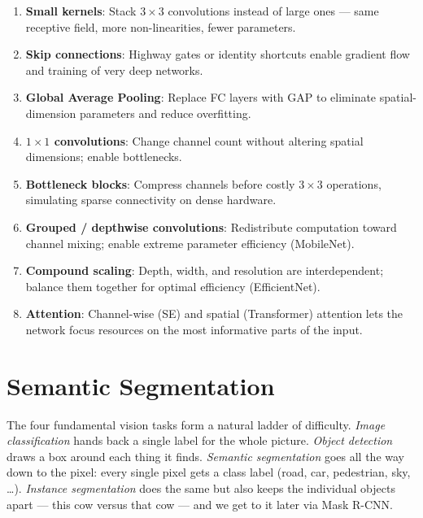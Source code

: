 \documentclass[11pt, oneside]{book}
\begin{document}
\begin{enumerate}
  \item \textbf{Small kernels}: Stack $3\times3$ convolutions instead of large ones —
        same receptive field, more non-linearities, fewer parameters.
  \item \textbf{Skip connections}: Highway gates or identity shortcuts enable
        gradient flow and training of very deep networks.
  \item \textbf{Global Average Pooling}: Replace FC layers with GAP to eliminate
        spatial-dimension parameters and reduce overfitting.
  \item \textbf{$1\times1$ convolutions}: Change channel count without altering
        spatial dimensions; enable bottlenecks.
  \item \textbf{Bottleneck blocks}: Compress channels before costly $3\times3$ operations,
        simulating sparse connectivity on dense hardware.
  \item \textbf{Grouped / depthwise convolutions}: Redistribute computation toward
        channel mixing; enable extreme parameter efficiency (MobileNet).
  \item \textbf{Compound scaling}: Depth, width, and resolution are interdependent;
        balance them together for optimal efficiency (EfficientNet).
  \item \textbf{Attention}: Channel-wise (SE) and spatial (Transformer) attention
        lets the network focus resources on the most informative parts of the input.
\end{enumerate}


\chapter{Semantic Segmentation}

The four fundamental vision tasks form a natural ladder of difficulty.
\emph{Image classification} hands back a single label for the whole picture.
\emph{Object detection} draws a box around each thing it finds.
\emph{Semantic segmentation} goes all the way down to the pixel: every single
pixel gets a class label (road, car, pedestrian, sky, \dots).
\emph{Instance segmentation} does the same but also keeps the individual objects
apart --- this cow versus that cow --- and we get to it later via Mask R-CNN.
\end{document}

